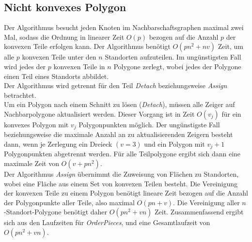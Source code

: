 \documentclass[ngerman]{seminarbeitrag}
\begin{document}
\subsection{Nicht konvexes Polygon}
Der Algorithmus \ord besucht jeden Knoten im Nachbarschaftsgraphen maximal zwei Mal, sodass die Ordnung in linearer Zeit $O(p)$ bezogen auf die Anzahl $p$ der konvexen Teile erfolgen kann.
Der Algorithmus \noncon benötigt $O(pn^{2} + nv)$ Zeit, um alle $p$ konvexen Teile unter den $n$ Standorten aufzuteilen. Im ungünstigsten Fall wird jedes der $p$ konvexen Teile in $n$ Polygone zerlegt, wobei jedes der Polygone einen Teil eines Standorts abbildet.\\
Der Algorithmus \daa wird getrennt für den Teil \emph{Detach} beziehungsweise \emph{Assign} betrachtet.\\
Um ein Polygon nach einem Schnitt zu lösen (\emph{Detach}), müssen alle Zeiger auf Nachbarpolygone aktualisiert werden. Dieser Vorgang ist in Zeit $O(v_{j})$ für ein konvexes Polygon mit $v_{j}$ Polygonpunkten möglich. Der ungünstigste Fall beziehungsweise die maximale Anzahl an zu aktualisierenden Zeigern besteht dann, wenn je Zerlegung ein Dreieck $(v=3)$ und ein Polygon mit $v_{j}+1$ Polygonpunkten abgetrennt werden. Für alle Teilpolygone ergibt sich dann eine maximale Zeit von $O(v + pn^{2})$.\\
Der Algorithmus \emph{Assign} übernimmt die Zuweisung von Flächen zu Standorten, wobei eine Fläche aus einem Set von konvexen Teilen besteht. Die Vereinigung der konvexen Teile zu einem Polygon benötigt lineare Zeit bezogen auf die Anzahl der Polygonpunkte aller Teile, also maximal $O(pn + v)$. Die Vereinigung aller $n$-Standort-Polygone benötigt daher $O(pn^{2}+ vn)$ Zeit. 
Zusammenfassend ergibt sich aus den Laufzeiten für \mbox{\textit{OrderPieces}}, \noncon und \daa eine Gesamtlaufzeit von $O(pn^{2} + vn)$.


\end{document}
